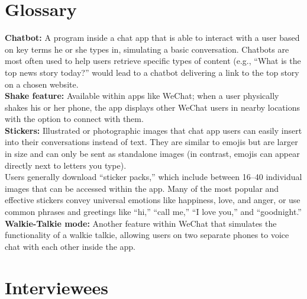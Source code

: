 \documentclass[notoc, symmetric, nobib, nols]{towcenter-guideto-book}
\newcommand{\blankpage}{\newpage\hbox{}\thispagestyle{empty}\newpage}
\begin{document}


\chapter{Glossary}
\blankpage

\textbf{Chatbot:} A program inside a chat app that is able to interact with a user based on key terms he or she types in, simulating a basic conversation. Chatbots are most often used to help users retrieve specific types of content (e.g., ``What is the top news story today?'' would lead to a chatbot delivering a link to the top story on a chosen website.\\
\vspace{\baselineskip}
\noindent\textbf{Shake feature:} Available within apps like WeChat; when a user physically shakes his or her phone, the app displays other WeChat users in nearby locations with the option to connect with them.\\
\vspace{\baselineskip}
\noindent\textbf{Stickers:} Illustrated or photographic images that chat app users can easily insert into their conversations instead of text. They are similar to emojis but are larger in size and can only be sent as standalone images (in contrast, emojis can appear directly next to letters you type). \\
\vspace{\baselineskip}
\noindent Users generally download ``sticker packs,'' which include between 16--40 individual images that can be accessed within the app. Many of the most popular and effective stickers convey universal emotions like happiness, love, and anger, or use common phrases and greetings like ``hi,'' ``call me,'' ``I love you,'' and ``goodnight.''\\
\vspace{\baselineskip}
\noindent\textbf{Walkie-Talkie mode:} Another feature within WeChat that simulates the functionality of a walkie talkie, allowing users on two separate phones to voice chat with each other inside the app.\\


\chapter{Interviewees}
\blankpage
\end{document}
